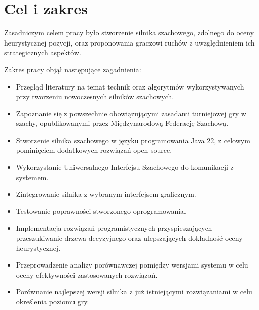 \section{Cel i zakres}
\label{sec:cel-i-zakres}

Zasadniczym celem pracy było stworzenie silnika szachowego, zdolnego do oceny heurystycznej pozycji, oraz proponowania graczowi ruchów z uwzględnieniem ich strategicznych aspektów.

Zakres pracy objął następujące zagadnienia:
\begin{itemize}
    \item Przegląd literatury na temat technik oraz algorytmów wykorzystywanych przy tworzeniu nowoczesnych silników szachowych.
    \item Zapoznanie się z powszechnie obowiązującymi zasadami turniejowej gry w szachy, opublikowanymi przez Międzynarodową Federację Szachową.
    \item Stworzenie silnika szachowego w języku programowania Java 22, z celowym pominięciem dodatkowych rozwiązań open-source.
    \item Wykorzystanie Uniwersalnego Interfejsu Szachowego do komunikacji z systemem.
    \item Zintegrowanie silnika z wybranym interfejsem graficznym.
    \item Testowanie poprawności stworzonego oprogramowania.
    \item Implementacja rozwiązań programistycznych przyspieszających przeszukiwanie drzewa decyzyjnego oraz ulepszających dokładność oceny heurystycznej.
    \item Przeprowadzenie analizy porównawczej pomiędzy wersjami systemu w celu oceny efektywności zastosowanych rozwiązań.
    \item Porównanie najlepszej wersji silnika z już istniejącymi rozwiązaniami w celu określenia poziomu gry.
\end{itemize}

